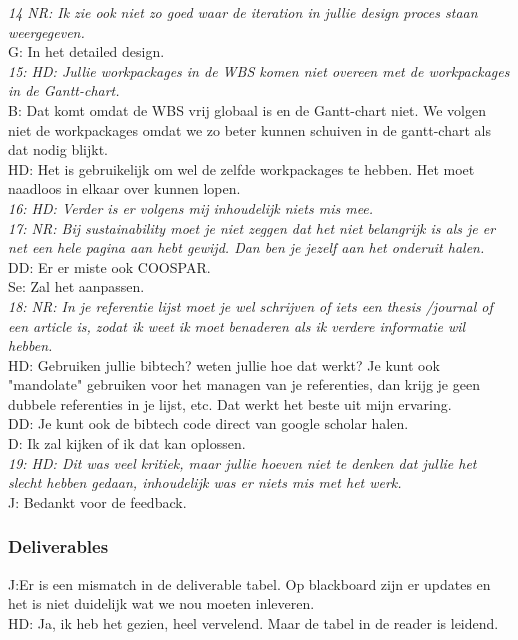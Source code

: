 \textit{14 NR: Ik zie ook niet zo goed waar de iteration in jullie design proces staan weergegeven.}\\
G: In het detailed design.\\

\textit{15: HD: Jullie workpackages in de WBS komen niet overeen met de workpackages in de Gantt-chart.}\\
B: Dat komt omdat de WBS vrij globaal is en de Gantt-chart niet. We volgen niet de workpackages omdat we zo beter kunnen schuiven in de gantt-chart als dat nodig blijkt.\\
HD: Het is gebruikelijk om wel de zelfde workpackages te hebben. Het moet naadloos in elkaar over kunnen lopen.\\

\textit{16: HD: Verder is er volgens mij inhoudelijk niets mis mee.}\\

\textit{17: NR: Bij sustainability moet je niet zeggen dat het niet belangrijk is als je er net een hele pagina aan hebt gewijd. Dan ben je jezelf aan het onderuit halen.}\\
DD: Er er miste ook COOSPAR.\\
Se: Zal het aanpassen.\\

\textit{18: NR: In je referentie lijst moet je wel schrijven of iets een thesis /journal of een article is, zodat ik weet ik moet benaderen als ik verdere informatie wil hebben.}\\
HD: Gebruiken jullie bibtech? weten jullie hoe dat werkt? Je kunt ook "mandolate" gebruiken voor het managen van je referenties, dan krijg je geen dubbele referenties in je lijst, etc. Dat werkt het beste uit mijn ervaring.\\
DD: Je kunt ook de bibtech code direct van google scholar halen.\\
D: Ik zal kijken of ik dat kan oplossen.\\

\textit{19: HD: Dit was veel kritiek, maar jullie hoeven niet te denken dat jullie het slecht hebben gedaan, inhoudelijk was er niets mis met het werk.}\\

J: Bedankt voor de feedback.\\


\subsubsection{Deliverables}
J:Er is een mismatch in de deliverable tabel. Op blackboard zijn er updates en het is niet duidelijk wat we nou moeten inleveren.\\
HD: Ja, ik heb het gezien, heel vervelend. Maar de tabel in de reader is leidend.\\

